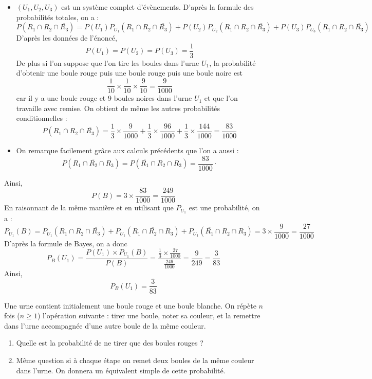 \documentclass[a4paper,twoside,french,10pt]{VcCours}
\begin{document}
\begin{itemize}
\item $(U_1,U_2,U_3)$ est un système complet d'évènements. D'après la formule des probabilités totales, on a : 
\[ P( R_1 \cap R_2 \cap \overline{R_3}) = P(U_1) P_{U_1}( R_1 \cap R_2 \cap \overline{R_3}) + P(U_2) P_{U_2}( R_1 \cap R_2 \cap \overline{R_3}) + P(U_3) P_{U_3}( R_1 \cap R_2 \cap \overline{R_3}) \]
D'après les données de l'énoncé, 
$$P(U_1)= P(U_2)= P(U_3)= \frac{1}{3}$$
De plus si l'on suppose que l'on tire les boules dans l'urne $U_1$, la probabilité d'obtenir une boule rouge puis une boule rouge puis une boule noire est 
$$\frac{1}{10} \times \frac{1}{10} \times \frac{9}{10} = \frac{9}{1000}$$ car il y a une boule rouge et 9 boules noires dans l'urne $U_1$ et que l'on travaille avec remise. On obtient de même les autres probabilités conditionnelles :
\[ P( R_1 \cap R_2 \cap \overline{R_3}) = \frac{1}{3} \times \frac{9}{1000} + \frac{1}{3} \times \frac{96}{1000} + \frac{1}{3} \times \frac{144}{1000} = \frac{83}{1000} \]
\item On remarque facilement grâce aux calculs précédents que l'on a aussi :
$$P(R_1 \cap \overline{R_2} \cap R_3) = P(\overline{R_1} \cap R_2 \cap R_3) = \frac{83}{1000} \cdot$$
\end{itemize}
Ainsi, 
$$ P(B) = 3 \times \frac{83}{1000} = \frac{249}{1000}$$
En raisonnant de la même manière et en utilisant que $P_{U_1}$ est une probabilité, on a :
\[ P_{U_1}(B) =  P_{U_1}(R_1 \cap R_2 \cap \overline{R_3}) + P_{U_1}(R_1 \cap \overline{R_2} \cap R_3) + P_{U_1} (\overline{R_1} \cap R_2 \cap R_3) = 3 \times \frac{9}{1000} = \frac{27}{1000} \]
D'après la formule de Bayes, on a donc 
\[ P_{B}(U_1) = \frac{P(U_1) \times P_{U_1}(B) }{P(B)} = \frac{\frac{1}{3} \times \frac{27}{1000}}{\frac{249}{1000}} = \frac{9}{249} = \frac{3}{83} \]
Ainsi,
$$ P_{B}(U_1) = \frac{3}{83} $$

\begin{Exercice}{} Une urne contient initialement une boule rouge et une boule blanche. On répète $n$ fois ($n \geq 1$) l'opération suivante : tirer une boule, noter sa couleur, et la remettre dans l'urne accompagnée d'une autre boule de la même couleur. 

\begin{enumerate}
\item Quelle est la probabilité de ne tirer que des boules rouges ?
\item Même question si à chaque étape on remet deux boules de la même couleur dans l'urne. On donnera un équivalent simple de cette probabilité.
\end{enumerate}
\end{Exercice} 
\end{document}
